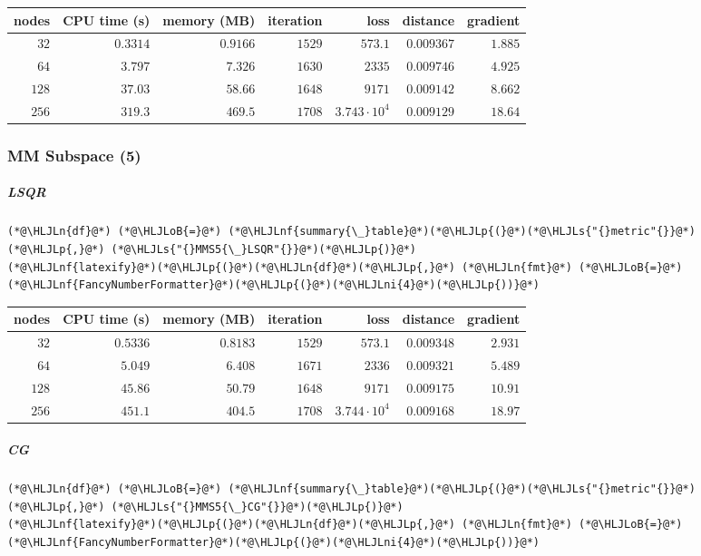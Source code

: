 \documentclass[12pt,a4paper]{article}
\newcommand{\HLJLn}[1]{#1}
\newcommand{\HLJLnf}[1]{\textcolor[RGB]{66,102,213}{#1}}
\newcommand{\HLJLs}[1]{\textcolor[RGB]{201,61,57}{#1}}
\newcommand{\HLJLni}[1]{\textcolor[RGB]{59,151,46}{#1}}
\newcommand{\HLJLoB}[1]{\textcolor[RGB]{102,102,102}{\textbf{#1}}}
\newcommand{\HLJLp}[1]{#1}
\begin{document}
\begin{tabular}
{r | r | r | r | r | r | r}
nodes & CPU time (s) & memory (MB) & iteration & loss & distance & gradient \\
\hline
$32$ & $0.3314$ & $0.9166$ & $1529$ & $573.1$ & $0.009367$ & $1.885$ \\
$64$ & $3.797$ & $7.326$ & $1630$ & $2335$ & $0.009746$ & $4.925$ \\
$128$ & $37.03$ & $58.66$ & $1648$ & $9171$ & $0.009142$ & $8.662$ \\
$256$ & $319.3$ & $469.5$ & $1708$ & $3.743 \cdot 10^{4}$ & $0.009129$ & $18.64$ \\
\end{tabular}


\subsubsection{MM Subspace (5)}
\subparagraph{LSQR}

\begin{lstlisting}
(*@\HLJLn{df}@*) (*@\HLJLoB{=}@*) (*@\HLJLnf{summary{\_}table}@*)(*@\HLJLp{(}@*)(*@\HLJLs{"{}metric"{}}@*)(*@\HLJLp{,}@*) (*@\HLJLs{"{}MMS5{\_}LSQR"{}}@*)(*@\HLJLp{)}@*)
(*@\HLJLnf{latexify}@*)(*@\HLJLp{(}@*)(*@\HLJLn{df}@*)(*@\HLJLp{,}@*) (*@\HLJLn{fmt}@*) (*@\HLJLoB{=}@*) (*@\HLJLnf{FancyNumberFormatter}@*)(*@\HLJLp{(}@*)(*@\HLJLni{4}@*)(*@\HLJLp{))}@*)
\end{lstlisting}


\begin{tabular}
{r | r | r | r | r | r | r}
nodes & CPU time (s) & memory (MB) & iteration & loss & distance & gradient \\
\hline
$32$ & $0.5336$ & $0.8183$ & $1529$ & $573.1$ & $0.009348$ & $2.931$ \\
$64$ & $5.049$ & $6.408$ & $1671$ & $2336$ & $0.009321$ & $5.489$ \\
$128$ & $45.86$ & $50.79$ & $1648$ & $9171$ & $0.009175$ & $10.91$ \\
$256$ & $451.1$ & $404.5$ & $1708$ & $3.744 \cdot 10^{4}$ & $0.009168$ & $18.97$ \\
\end{tabular}


\subparagraph{CG}

\begin{lstlisting}
(*@\HLJLn{df}@*) (*@\HLJLoB{=}@*) (*@\HLJLnf{summary{\_}table}@*)(*@\HLJLp{(}@*)(*@\HLJLs{"{}metric"{}}@*)(*@\HLJLp{,}@*) (*@\HLJLs{"{}MMS5{\_}CG"{}}@*)(*@\HLJLp{)}@*)
(*@\HLJLnf{latexify}@*)(*@\HLJLp{(}@*)(*@\HLJLn{df}@*)(*@\HLJLp{,}@*) (*@\HLJLn{fmt}@*) (*@\HLJLoB{=}@*) (*@\HLJLnf{FancyNumberFormatter}@*)(*@\HLJLp{(}@*)(*@\HLJLni{4}@*)(*@\HLJLp{))}@*)
\end{lstlisting}
\end{document}
